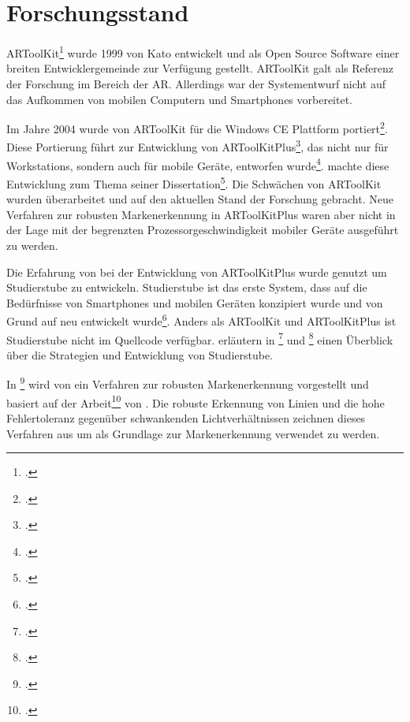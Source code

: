 \section{Forschungsstand} %
\label{sec:forschungsstand}
\begin{comment}
	Forschungsstand: Alle untersuchten Arbeiten aufführen und kurz erklären.
\end{comment}

ARToolKit\footcite{artoolkit} wurde 1999 von Kato entwickelt und als Open Source Software einer breiten
 Entwicklergemeinde zur Verfügung gestellt. ARToolKit galt als Referenz der Forschung im Bereich der \gls{AR}.
 Allerdings war der Systementwurf nicht auf das Aufkommen von mobilen Computern und Smartphones vorbereitet.

Im Jahre 2004 wurde von \citeauthor{wagner04} ARToolKit für die Windows CE Plattform portiert\footcite{wagner04}. Diese
 Portierung führt zur Entwicklung von ARToolKitPlus\footcite{artoolkitplus}, das nicht nur für Workstations, sondern
 auch für mobile Geräte, entworfen wurde\footcite{wagner07b}. \citeauthor{wagner07a} machte diese Entwicklung zum Thema
 seiner Dissertation\footcite{wagner07a}. Die Schwächen von ARToolKit wurden überarbeitet und auf den aktuellen Stand
 der Forschung gebracht. Neue Verfahren zur robusten Mar\-ken\-er\-kennung in ARToolKitPlus waren aber
 nicht in der Lage mit der begrenzten Prozessorgeschwindigkeit mobiler Geräte ausgeführt zu werden.

Die Erfahrung von \citeauthor{wagner04} bei der Entwicklung von ARToolKitPlus wurde genutzt um
 Studierstube zu entwickeln. Studierstube ist das erste System, dass auf die Bedürfnisse von Smartphones und mobilen
 Geräten konzipiert wurde und von Grund auf neu entwickelt wurde\footcite{studierstube}. Anders als ARToolKit und
 ARToolKitPlus ist Studierstube nicht im Quellcode verfügbar.
\citeauthor{wagner09a} erläutern in \footcite{wagner09a} und
 \footcite{wagner09b} einen Überblick über die Strategien und Entwicklung von Studierstube.

In \footcite{hirzer08} wird von \citeauthor{hirzer08} ein Verfahren zur robusten Markenerkennung
 vorgestellt und basiert auf der Arbeit\footcite{clarke96} von \citeauthor{clarke96}. Die robuste Erkennung von Linien
 und die hohe Fehlertoleranz gegenüber schwankenden Lichtverhältnissen zeichnen dieses Verfahren aus um als Grundlage
 zur Markenerkennung verwendet zu werden.

